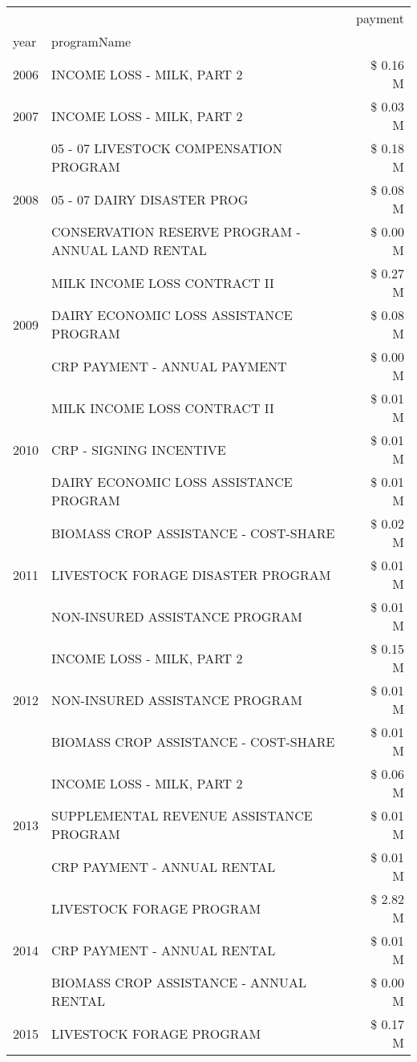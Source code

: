 \begin{tabular}{llr}
\toprule
 &  & payment \\
year & programName &  \\
\midrule
2006 & INCOME LOSS - MILK, PART 2 & \$ 0.16 M \\
\cline{1-3}
2007 & INCOME LOSS - MILK, PART 2 & \$ 0.03 M \\
\cline{1-3}
\multirow[t]{3}{*}{2008} & 05 - 07 LIVESTOCK COMPENSATION PROGRAM & \$ 0.18 M \\
 & 05 - 07 DAIRY DISASTER PROG & \$ 0.08 M \\
 & CONSERVATION RESERVE PROGRAM - ANNUAL LAND RENTAL & \$ 0.00 M \\
\cline{1-3}
\multirow[t]{3}{*}{2009} & MILK INCOME LOSS CONTRACT II & \$ 0.27 M \\
 & DAIRY ECONOMIC LOSS ASSISTANCE PROGRAM & \$ 0.08 M \\
 & CRP PAYMENT - ANNUAL PAYMENT & \$ 0.00 M \\
\cline{1-3}
\multirow[t]{3}{*}{2010} & MILK INCOME LOSS CONTRACT II & \$ 0.01 M \\
 & CRP - SIGNING INCENTIVE & \$ 0.01 M \\
 & DAIRY ECONOMIC LOSS ASSISTANCE PROGRAM & \$ 0.01 M \\
\cline{1-3}
\multirow[t]{3}{*}{2011} & BIOMASS CROP ASSISTANCE - COST-SHARE & \$ 0.02 M \\
 & LIVESTOCK FORAGE DISASTER PROGRAM & \$ 0.01 M \\
 & NON-INSURED ASSISTANCE PROGRAM & \$ 0.01 M \\
\cline{1-3}
\multirow[t]{3}{*}{2012} & INCOME LOSS - MILK, PART 2 & \$ 0.15 M \\
 & NON-INSURED ASSISTANCE PROGRAM & \$ 0.01 M \\
 & BIOMASS CROP ASSISTANCE - COST-SHARE & \$ 0.01 M \\
\cline{1-3}
\multirow[t]{3}{*}{2013} & INCOME LOSS - MILK, PART 2 & \$ 0.06 M \\
 & SUPPLEMENTAL REVENUE ASSISTANCE PROGRAM & \$ 0.01 M \\
 & CRP PAYMENT - ANNUAL RENTAL & \$ 0.01 M \\
\cline{1-3}
\multirow[t]{3}{*}{2014} & LIVESTOCK FORAGE PROGRAM & \$ 2.82 M \\
 & CRP PAYMENT - ANNUAL RENTAL & \$ 0.01 M \\
 & BIOMASS CROP ASSISTANCE - ANNUAL RENTAL & \$ 0.00 M \\
\cline{1-3}
\multirow[t]{3}{*}{2015} & LIVESTOCK FORAGE PROGRAM & \$ 0.17 M \\

\end{tabular}
